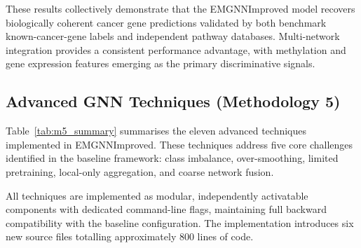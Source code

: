 These results collectively demonstrate that the EMGNNImproved model recovers biologically
coherent cancer gene predictions validated by both benchmark known-cancer-gene labels and
independent pathway databases. Multi-network integration provides a consistent performance
advantage, with methylation and gene expression features emerging as the primary
discriminative signals.

\subsection{Advanced GNN Techniques (Methodology 5)}
\label{sec:m5_results}

Table~\ref{tab:m5_summary} summarises the eleven advanced techniques implemented in
EMGNNImproved. These techniques address five core challenges identified in the baseline
framework: class imbalance, over-smoothing, limited pretraining, local-only aggregation,
and coarse network fusion.

All techniques are implemented as modular, independently activatable components with
dedicated command-line flags, maintaining full backward compatibility with the baseline
configuration. The implementation introduces six new source files totalling approximately
800 lines of code.


